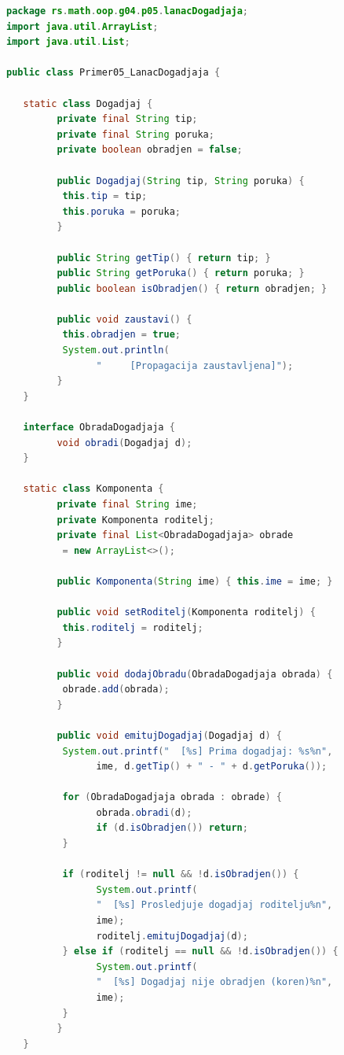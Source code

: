 \begin{lstlisting}[language=Java]
package rs.math.oop.g04.p05.lanacDogadjaja;
import java.util.ArrayList;
import java.util.List;
 
public class Primer05_LanacDogadjaja {
 
   static class Dogadjaj {
         private final String tip;
         private final String poruka;
         private boolean obradjen = false;
 
         public Dogadjaj(String tip, String poruka) {
          this.tip = tip;
          this.poruka = poruka;
         }
 
         public String getTip() { return tip; }
         public String getPoruka() { return poruka; }
         public boolean isObradjen() { return obradjen; }
 
         public void zaustavi() {
          this.obradjen = true;
          System.out.println(
                "     [Propagacija zaustavljena]");
         }
   }
 
   interface ObradaDogadjaja {
         void obradi(Dogadjaj d);
   }
 
   static class Komponenta {
         private final String ime;
         private Komponenta roditelj;
         private final List<ObradaDogadjaja> obrade
          = new ArrayList<>();
 
         public Komponenta(String ime) { this.ime = ime; }
 
         public void setRoditelj(Komponenta roditelj) {
          this.roditelj = roditelj;
         }
 
         public void dodajObradu(ObradaDogadjaja obrada) {
          obrade.add(obrada);
         }
 
         public void emitujDogadjaj(Dogadjaj d) {
          System.out.printf("  [%s] Prima dogadjaj: %s%n",
                ime, d.getTip() + " - " + d.getPoruka());
 
          for (ObradaDogadjaja obrada : obrade) {
                obrada.obradi(d);
                if (d.isObradjen()) return;
          }
 
          if (roditelj != null && !d.isObradjen()) {
                System.out.printf(
                "  [%s] Prosledjuje dogadjaj roditelju%n",
                ime);
                roditelj.emitujDogadjaj(d);
          } else if (roditelj == null && !d.isObradjen()) {
                System.out.printf(
                "  [%s] Dogadjaj nije obradjen (koren)%n",
                ime);
          }
         }
   }
 

\end{lstlisting}
